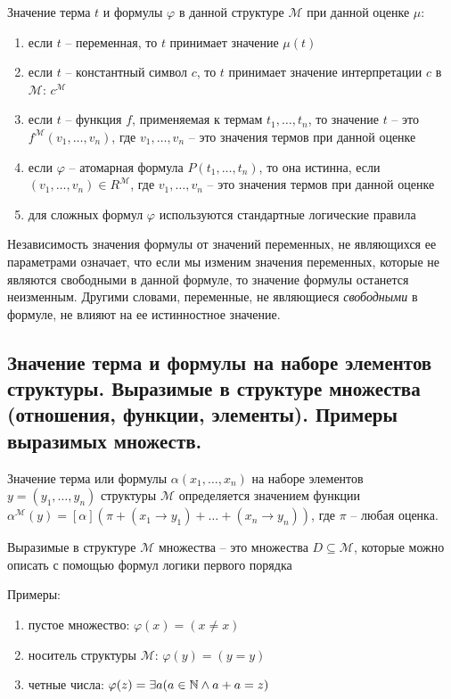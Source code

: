 \documentclass[a4paper, 10pt]{article}
\newcommand{\MM}{\mathcal{M}}
\begin{document}
Значение терма $t$ и формулы $\varphi$ в данной структуре $\MM$ при данной оценке $\mu$: 
\begin{enumerate}
    \item если $t$ -- переменная, то $t$ принимает значение $\mu(t)$
    \item если $t$ -- константный символ $c$, то $t$ принимает значение интерпретации $c$ в $\MM$: $c^\MM$
    \item если $t$ -- функция $f$, применяемая к термам $t_1,\ldots,t_n$, то значение $t$ -- это $f^\MM(v_1,\ldots,v_n)$, где $v_1,\ldots,v_n$ -- это значения термов при данной оценке
    \item если $\varphi$ -- атомарная формула $P(t_1,\ldots,t_n)$, то она истинна, если $(v_1,\ldots,v_n)\in R^\MM$, где $v_1,\ldots,v_n$ -- это значения термов при данной оценке
    \item для сложных формул $\varphi$ используются стандартные логические правила
\end{enumerate}

Независимость значения формулы от значений переменных, не являющихся ее параметрами означает, что если мы изменим значения переменных, которые не являются свободными в данной формуле, то значение формулы останется неизменным. Другими словами, переменные, не являющиеся \textit{свободными} в формуле, не влияют на ее истинностное значение.

\subsection{Значение терма и формулы на наборе элементов структуры. Выразимые в структуре множества (отношения, функции, элементы). Примеры выразимых множеств.}

Значение терма или формулы $\alpha(x_1,\ldots,x_n)$ на наборе элементов $y=(y_1,\ldots,y_n)$ структуры $\MM$ определяется значением функции $\alpha^\MM(y)=[\alpha](\pi + (x_1\to y_1) + \ldots + (x_n\to y_n))$, где $\pi$ -- любая оценка.

\hfill

Выразимые в структуре $\MM$ множества -- это множества $D\subseteq\MM$, которые можно описать с помощью формул логики первого порядка

Примеры:
\begin{enumerate}
    \item пустое множество: $\varphi(x)=(x\not=x)$
    \item носитель структуры $\MM$: $\varphi(y)=(y=y)$
    \item четные числа: $\varphi(z)=\exists a (a\in\mathbb{N} \land a+a=z)$
\end{enumerate}
\end{document}

